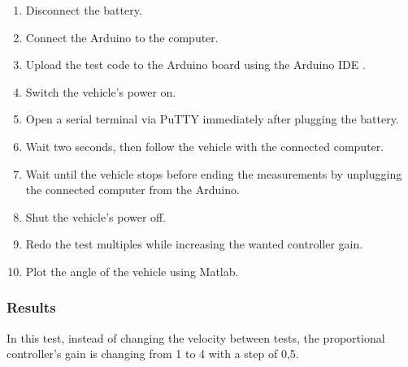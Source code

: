 \begin{enumerate}
  \item Disconnect the battery.
  \item Connect the Arduino to the computer.
  \item Upload the test code to the Arduino board using the Arduino IDE  \cite{ArduinoIDE}.
  \item Switch the vehicle's power on.
  \item Open a serial terminal via PuTTY \cite{PuTTY} immediately after plugging the battery.
  \item Wait two seconds, then follow the vehicle with the connected computer.
  \item Wait until the vehicle stops before ending the measurements by unplugging the connected computer from the Arduino.
  \item Shut the vehicle's power off.
  \item Redo the test multiples while increasing the wanted controller gain.
  \item Plot the angle of the vehicle using Matlab.
\end{enumerate}

\subsubsection{Results}

In this test, instead of changing the velocity between tests, the proportional controller's gain is changing from 1 to 4 with a step of 0,5.\\


